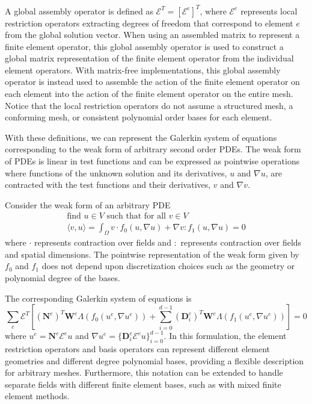 A global assembly operator is defined as $\mathcal{E}^T = \left[ \mathcal{E}^e \right]^T$, where $\mathcal{E}^e$ represents local restriction operators extracting degrees of freedom that correspond to element $e$ from the global solution vector.
When using an assembled matrix to represent a finite element operator, this global assembly operator is used to construct a global matrix representation of the finite element operator from the individual element operators.
With matrix-free implementations, this global assembly operator is instead used to assemble the action of the finite element operator on each element into the action of the finite element operator on the entire mesh.
Notice that the local restriction operators do not assume a structured mesh, a conforming mesh, or consistent polynomial order bases for each element.

With these definitions, we can represent the Galerkin system of equations corresponding to the weak form of arbitrary second order PDEs.
The weak form of PDEs is linear in test functions and can be expressed as pointwise operations where functions of the unknown solution and its derivatives, $u$ and $\nabla u$, are contracted with the test functions and their derivatives, $v$ and $\nabla v$.

Consider the weak form of an arbitrary PDE
\begin{equation}
\begin{array}{c}
\text{find } u \in V \text{ such that for all } v \in V\\
\langle v, u \rangle = \int_{\Omega} v \cdot f_0 \left( u, \nabla u \right) + \nabla v : f_1 \left( u, \nabla u \right) = 0
\end{array}
\label{eq:weak_form}
\end{equation}
where $\cdot$ represents contraction over fields and $:$ represents contraction over fields and spatial dimensions.
The pointwise representation of the weak form given by $f_0$ and $f_1$ does not depend upon discretization choices such as the geometry or polynomial degree of the bases.

The corresponding Galerkin system of equations is
\begin{equation}
\sum_e \mathcal{E}^T \left[ \left( \mathbf{N}^e \right)^T \mathbf{W}^e \Lambda \left( f_0 \left( u^e, \nabla u^e \right) \right) + \sum_{i = 0}^{d - 1} \left( \mathbf{D}_i^e \right)^T \mathbf{W}^e \Lambda \left( f_1 \left( u^e, \nabla u^e \right) \right) \right] = 0
\label{eq:galerkin_form}
\end{equation}
where $u^e = \mathbf{N}^e \mathcal{E}^e u$ and $\nabla u^e = \lbrace \mathbf{D}_i^e \mathcal{E}^e u \rbrace_{i = 0}^{d - 1}$.
In this formulation, the element restriction operators and basis operators can represent different element geometries and different degree polynomial bases, providing a flexible description for arbitrary meshes.
Furthermore, this notation can be extended to handle separate fields with different finite element bases, such as with mixed finite element methods.

